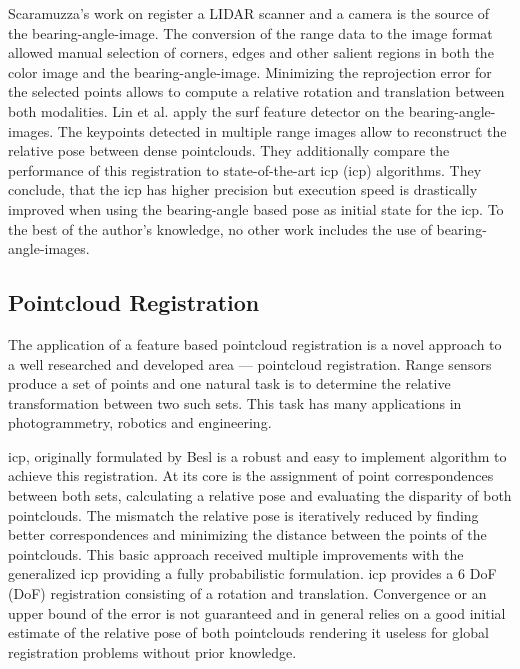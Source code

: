 Scaramuzza's\cite{scaramuzza_iros2007} work on register a \acrshort{LIDAR} scanner and a camera is the source of the \gls{bearing-angle-image}.
The conversion of the range data to the image format allowed manual selection of corners, edges and other salient regions in both the color image and the \gls{bearing-angle-image}.
Minimizing the reprojection error for the selected points allows to compute a relative rotation and translation between both modalities.
Lin et al.\cite{lin_easp2017} apply the \acrshort{surf}\cite{bay_eccv06} feature detector on the \glspl{bearing-angle-image}.
The keypoints detected in multiple range images allow to reconstruct the relative pose between dense pointclouds.
They additionally compare the performance of this registration to state-of-the-art \acrshort{icp} (\acrlong{icp}) algorithms.
They conclude, that the \acrshort{icp} has higher precision but execution speed is drastically improved when using the \gls{bearing-angle} based pose as initial state for the \acrshort{icp}.
To the best of the author's knowledge, no other work includes the use of \glspl{bearing-angle-image}.

\subsection{Pointcloud Registration}

The application of a feature based pointcloud registration is a novel approach to a well researched and developed area --- pointcloud registration.
Range sensors produce a set of points and one natural task is to determine the relative transformation between two such sets.
This task has many applications in photogrammetry, robotics and engineering.

\acrshort{icp}, originally formulated by Besl\cite{besl_pami1992} is a robust and easy to implement algorithm to achieve this registration.
At its core is the assignment of point correspondences between both sets, calculating a relative pose and evaluating the disparity of both pointclouds.
The mismatch the relative pose is iteratively reduced by finding better correspondences and minimizing the distance between the points of the pointclouds.
This basic approach received multiple improvements with the generalized \acrshort{icp}\cite{segal_2009,korn_2014} providing a fully probabilistic formulation.
\acrshort{icp} provides a 6 \acrlong{DoF} (\acrshort{DoF}) registration consisting of a rotation and translation.
Convergence or an upper bound of the error is not guaranteed and in general relies on a good initial estimate of the relative pose of both pointclouds rendering it useless for global registration problems without prior knowledge.

